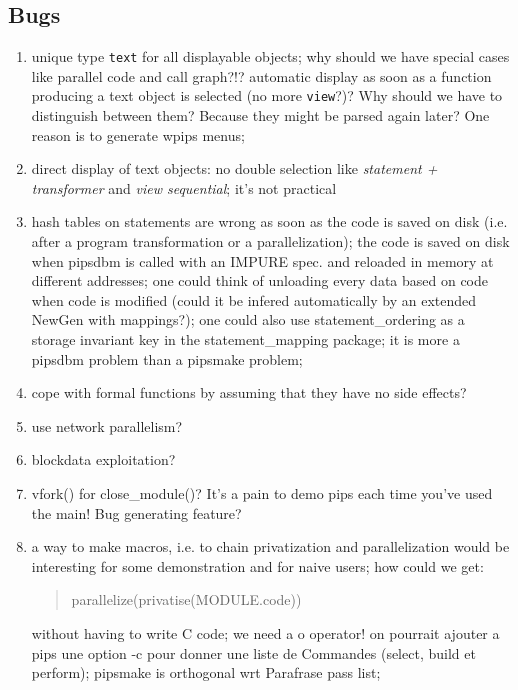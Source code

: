 \subsection{Bugs}

\begin{enumerate}

  \item unique type {\tt text} for all displayable objects; why should
	we have special cases like parallel code and call graph?!?
	automatic display as soon as a function producing a text object
	is selected (no more {\tt view}?)? Why should we have to distinguish
	between them? Because they might be parsed again later? One
	reason is to generate wpips menus;

  \item direct display of text objects: no double selection like
	{\em statement + transformer} and {\em view sequential}; it's
	not practical

  \item hash tables on statements are wrong as soon as the code is saved
	on disk (i.e. after a program transformation or a
	parallelization); the code is saved on disk when pipsdbm is called
	with an IMPURE spec. and reloaded in memory at different addresses;
	one could think of unloading every data based on code when code
	is modified (could it be infered automatically by an extended
	NewGen with mappings?); one could also use statement\_ordering as
	a storage invariant key in the statement\_mapping package;
	it is more a pipsdbm problem than a pipsmake problem;

  \item cope with formal functions by assuming that they have no side
	effects?

  \item use network parallelism?

  \item blockdata exploitation?

  \item vfork() for close\_module()? It's a pain to demo pips each time
	you've used the main! Bug generating feature?

  \item a way to make macros, i.e. to chain privatization and
	parallelization would be interesting for some demonstration and
	for naive users; how could we get:
	\begin{quote}
		parallelize(privatise(MODULE.code))
	\end{quote}
	without having to write C code; we need a o operator! on
	pourrait ajouter a pips une option -c pour donner une liste de
	Commandes (select, build et perform); 
	pipsmake is orthogonal wrt Parafrase pass list; 


\end{enumerate}
